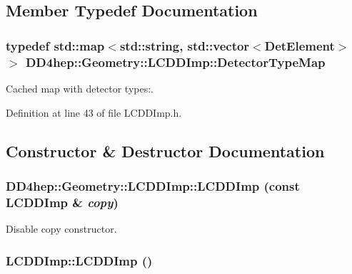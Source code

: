 \subsection{Member Typedef Documentation}
\hypertarget{class_d_d4hep_1_1_geometry_1_1_l_c_d_d_imp_af80f7fef6780569e2368b4c65bba3f58}{
\subsubsection[{DetectorTypeMap}]{\setlength{\rightskip}{0pt plus 5cm}typedef std::map$<$std::string, std::vector$<${\bf DetElement}$>$ $>$ {\bf DD4hep::Geometry::LCDDImp::DetectorTypeMap}}}
\label{class_d_d4hep_1_1_geometry_1_1_l_c_d_d_imp_af80f7fef6780569e2368b4c65bba3f58}


Cached map with detector types:. 

Definition at line 43 of file LCDDImp.h.

\subsection{Constructor \& Destructor Documentation}
\hypertarget{class_d_d4hep_1_1_geometry_1_1_l_c_d_d_imp_a4c1a7d15bece44b7b5e40e995aecde54}{
\subsubsection[{LCDDImp}]{\setlength{\rightskip}{0pt plus 5cm}DD4hep::Geometry::LCDDImp::LCDDImp (const {\bf LCDDImp} \& {\em copy})}}
\label{class_d_d4hep_1_1_geometry_1_1_l_c_d_d_imp_a4c1a7d15bece44b7b5e40e995aecde54}


Disable copy constructor. \hypertarget{class_d_d4hep_1_1_geometry_1_1_l_c_d_d_imp_ac9cfc0155701a769a74fcf67d58d8749}{
\subsubsection[{LCDDImp}]{\setlength{\rightskip}{0pt plus 5cm}LCDDImp::LCDDImp ()}}
\label{class_d_d4hep_1_1_geometry_1_1_l_c_d_d_imp_ac9cfc0155701a769a74fcf67d58d8749}


